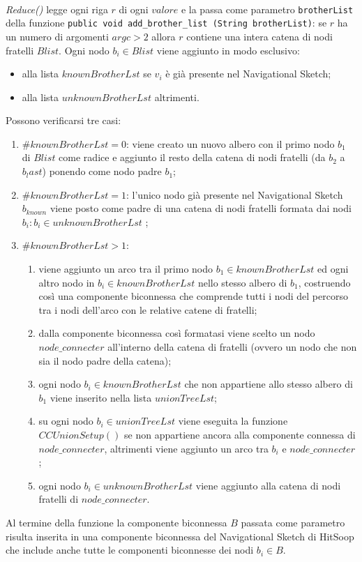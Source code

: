 \documentclass[a4paper,11pt]{report}
\begin{document}
\paragraph{}
\emph{Reduce()} legge ogni riga $r$ di ogni $valore$ e la passa come parametro \verb+brotherList+ della funzione 
\verb+public void add_brother_list (String brotherList)+: 
se $r$ ha un numero di argomenti $argc>2$ allora $r$ contiene una intera catena di nodi fratelli $Blist$. Ogni nodo $b_i\in Blist$ viene
aggiunto in modo esclusivo:
\begin{itemize}
 \item alla lista $knownBrotherLst$ se $v_i$ è già presente nel Navigational Sketch;
 \item alla lista $unknownBrotherLst$ altrimenti.
\end{itemize}
Possono verificarsi tre casi:
\begin{enumerate}
 \item $\#knownBrotherLst=0$: viene creato un nuovo albero con il primo nodo $b_1$ di $Blist$ come radice e aggiunto il resto della catena
di nodi fratelli (da $b_2$ a $b_last$)
ponendo come nodo padre $b_1$;
 \item $\#knownBrotherLst=1$:  l'unico nodo già presente nel Navigational Sketch $b_{known}$ viene posto come padre di una catena di nodi
fratelli formata dai nodi $b_i:b_i\in unknownBrotherLst$ ;
 \item $\#knownBrotherLst>1$: 
 \begin{enumerate}
  \item viene aggiunto un arco tra il primo nodo $b_1\in knownBrotherLst$ ed ogni altro nodo in $b_i\in knownBrotherLst$ nello stesso albero
di $b_1$, costruendo 
così una componente biconnessa che comprende tutti i nodi del percorso tra i nodi dell'arco con le relative catene di fratelli;
  \item dalla componente biconnessa così formatasi viene scelto un nodo $node\_connecter$ all'interno della catena di fratelli (ovvero un
nodo che non sia il nodo padre della catena);
  \item ogni nodo $b_i\in knownBrotherLst$ che non appartiene allo stesso albero di $b_1$ viene inserito nella lista $unionTreeLst$;
  \item su ogni nodo $b_i\in unionTreeLst$ viene eseguita la funzione $CCUnionSetup()$ se non appartiene ancora alla componente connessa di
$node\_connecter$, altrimenti viene aggiunto un
arco tra  $b_i$ e $node\_connecter$;
  \item ogni nodo $b_i\in unknownBrotherLst$ viene aggiunto alla catena di nodi fratelli di $node\_connecter$.
 \end{enumerate}
\end{enumerate}
Al termine della funzione la componente biconnessa $B$ passata come parametro risulta inserita in una componente biconnessa del Navigational
Sketch di HitSoop 
che include anche tutte le componenti biconnesse dei nodi $b_i\in B$. 
\end{document}
